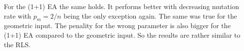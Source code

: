 For the (1+1) EA the same holds.
It performs better with decreasing mutation rate with $p_m=2/n$ being the only exception again.
The same was true for the geometric input.
The penality for the wrong parameter is also bigger for the (1+1) EA compared to the geometric input.
So the results are rather similar to the RLS.